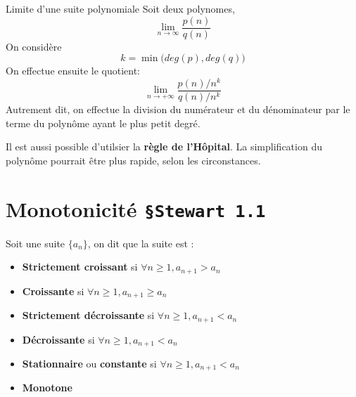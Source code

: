 \documentclass[16pt]{report}
\begin{document}
\begin{multicols*}{2}
    \begin{Concept}{Limite d'une suite polynomiale}{}
        \noindent Soit deux polynomes,
        \[ \lim\limits_{n\to \infty } \dfrac{p(n)}{q(n)}\] 
        On considère 
        \[ k = \min\bigl(deg(p), deg(q)\bigr) \]
        On effectue ensuite le quotient: 
        \[ \lim\limits_{n\to+\infty}\dfrac{p(n)/{n^k}}{q(n)/n^{k}} \]
        Autrement dit, on effectue la division du numérateur et du 
        dénominateur par le terme du polynôme ayant le plus petit degré. 
    \end{Concept}

    \begin{note}{}{}
        Il est aussi possible d'utilsier la \textbf{règle de l'Hôpital}. 
        La simplification du polynôme pourrait être plus rapide, selon 
        les circonstances. 
    \end{note}

    \section{Monotonicité \quad \texttt{\S Stewart 1.1}  }
    Soit une suite $\{a_n \}$, on dit que la suite est :
    \begin{itemize}
        \item \textbf{Strictement croissant} si $\forall n \geq 1, 
            a_{n+1} > a_n$
        \item \textbf{Croissante} si $\forall n \geq 1, 
            a_{n+1} \geq a_n$ 
        \item \textbf{Strictement décroissante} si $\forall n \geq 1, 
            a_{n+1} < a_n$ 
        \item \textbf{Décroissante} si $\forall n \geq 1, 
            a_{n+1} < a_n$ 
        \item \textbf{Stationnaire} ou \textbf{constante} si 
            $\forall n \geq 1, 
            a_{n+1} < a_n$ 
        \item \textbf{Monotone}  
    \end{itemize}


\end{multicols*}
\end{document}

